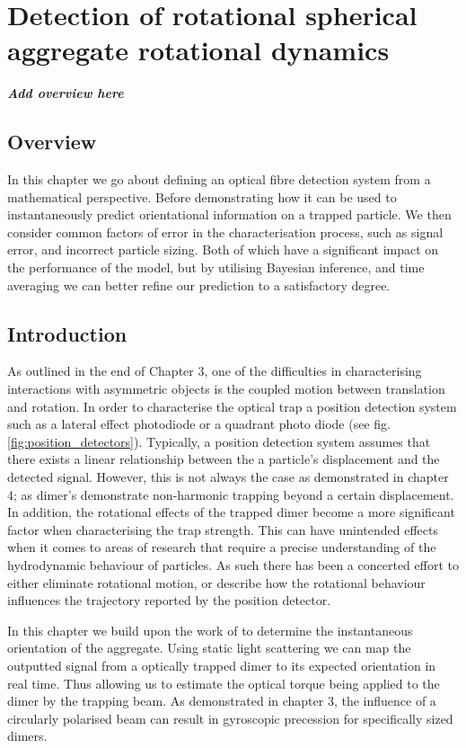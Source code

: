 \chapter{Detection of rotational spherical aggregate rotational dynamics}
\textit{\textbf{Add overview here}} \\
\label{chapter:simulated_detection}

\section{Overview}
In this chapter we go about defining an optical fibre detection 
system from a mathematical perspective. Before demonstrating how 
it can be used to instantaneously predict orientational information 
on a trapped particle. We then consider common factors of error in the 
characterisation process, such as signal error, and incorrect particle 
sizing. Both of which have a significant impact on the performance 
of the model, but by utilising Bayesian inference, and time averaging 
we can better refine our prediction to a satisfactory degree.   

\section{Introduction}
As outlined in the end of Chapter 3, one of the difficulties 
in characterising interactions with asymmetric objects is 
the coupled motion between translation and rotation. In order
to characterise the optical trap a position detection system 
such as a lateral effect photodiode or a quadrant photo diode
(see fig.\ref{fig:position_detectors}). Typically, a position 
detection system assumes that there exists a linear relationship 
between the a particle's displacement and the detected signal.
However, this is not always the case as demonstrated in chapter
4; as dimer's demonstrate non-harmonic trapping beyond a certain 
displacement. In addition, the rotational effects of the trapped
dimer become a more significant factor when characterising the 
trap strength. This can have unintended effects when it comes to
areas of research that require a precise understanding of the 
hydrodynamic behaviour of particles. As such there has been a 
concerted effort to either eliminate rotational motion, or describe
how the rotational behaviour influences the trajectory reported 
by the position detector. 

In this chapter we build upon the work of \cite{BarZiv1997} to 
determine the instantaneous orientation of the aggregate. Using 
static light scattering we can map the outputted signal from a 
optically trapped dimer to its expected orientation in real time. 
Thus allowing us to estimate the optical torque being applied to 
the dimer by the trapping beam. As demonstrated in chapter 3, 
the influence of a circularly polarised beam can result in 
gyroscopic precession for specifically sized dimers. 


